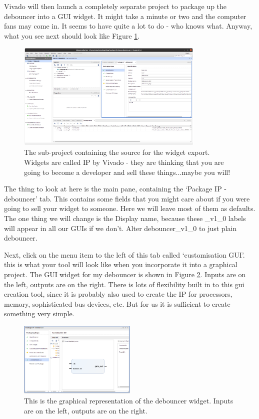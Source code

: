 \documentclass[../physical_computing.tex]{subfiles}
\begin{document}
Vivado will then launch a completely separate project to package up the debouncer into a GUI widget. It might take a minute or two and the computer fans may come in. It seems to have quite a lot to do - who knows what. Anyway, what you see next should look like Figure \ref{fig:makeguiscreen1}.

\begin{figure}[htbp]
    \centering
    \includegraphics[width=0.8\textwidth]{figures/makeguiscreen1.png}
    \caption{The sub-project containing the source for the widget export. Widgets are called IP by Vivado - they are thinking that you are going to become a developer and sell these things...maybe you will!}
    \label{fig:makeguiscreen1}
\end{figure}

The thing to look at here is the main pane, containing the `Package IP - debouncer' tab. This contains some fields that you might care about if you were going to sell your widget to someone. Here we will leave most of them as defaults. The one thing we will change is the Display name, because these \_v1\_0 labels will appear in all our GUIs if we don't. Alter debouncer\_v1\_0 to just plain debouncer.

Next, click on the menu item to the left of this tab called `customisation GUI'. this is what your tool will look like when you incorporate it into a graphical project. The GUI widget for my debouncer is shown in Figure \ref{fig:debouncergui}. Inputs are on the left, outputs are on the right. There is lots of flexibility built in to this gui creation tool, since it is probably also used to create the IP for processors, memory, sophisticated bus devices, etc. But for us it is sufficient to create something very simple. 

\begin{figure}[htbp]
    \centering
    \includegraphics[width=0.5\textwidth]{figures/justmywidget.png}
    \caption{This is the graphical representation of the debouncer widget. Inputs are on the left, outputs are on the right.}
    \label{fig:debouncergui}
\end{figure}
\end{document}

